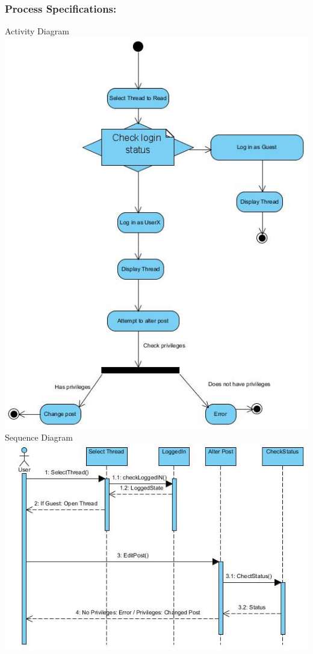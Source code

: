 \documentclass[a4paper,11pt]{article}
\begin{document}
\subsubsection{Process Specifications:} 
Activity Diagram\\
\includegraphics[width=1\linewidth]{./Images/CRUDThread/Diagrams/7.jpg}\\
\newpage
Sequence Diagram\\
\includegraphics[width=1\linewidth]{./Images/CRUDThread/Diagrams/8.jpg}\\
\end{document}
